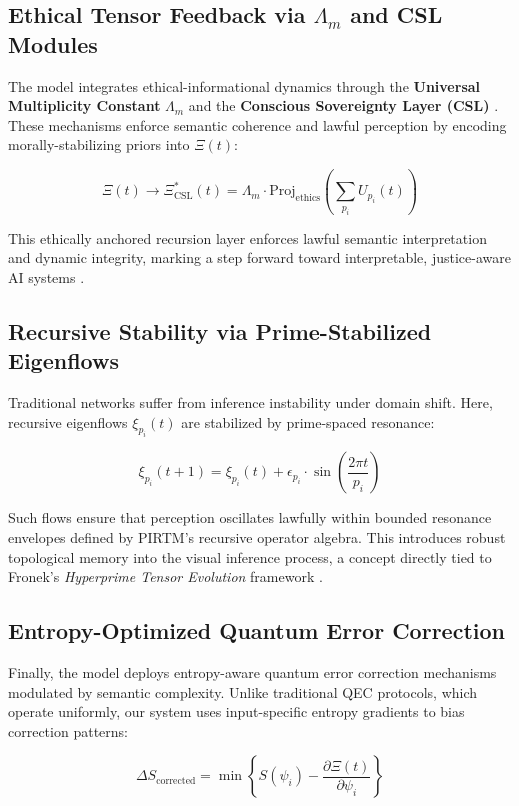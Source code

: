 \documentclass[12pt]{article}
\theoremstyle{plain}
\begin{document}
\subsection*{Ethical Tensor Feedback via $\Lambda_m$ and CSL Modules}

The model integrates ethical-informational dynamics through the \textbf{Universal Multiplicity Constant} $\Lambda_m$ and the \textbf{Conscious Sovereignty Layer (CSL)} \cite{boatwright2025}. These mechanisms enforce semantic coherence and lawful perception by encoding morally-stabilizing priors into $\Xi(t)$:

\[
\Xi(t) \rightarrow \Xi^*_{\text{CSL}}(t) = \Lambda_m \cdot \text{Proj}_{\text{ethics}} \left( \sum_{p_i} U_{p_i}(t) \right)
\]

This ethically anchored recursion layer enforces lawful semantic interpretation and dynamic integrity, marking a step forward toward interpretable, justice-aware AI systems \cite{russel2025}.

\subsection*{Recursive Stability via Prime-Stabilized Eigenflows}

Traditional networks suffer from inference instability under domain shift. Here, recursive eigenflows $\xi_{p_i}(t)$ are stabilized by prime-spaced resonance:

\[
\xi_{p_i}(t+1) = \xi_{p_i}(t) + \epsilon_{p_i} \cdot \sin\left( \frac{2\pi t}{p_i} \right)
\]

Such flows ensure that perception oscillates lawfully within bounded resonance envelopes defined by PIRTM’s recursive operator algebra. This introduces robust topological memory into the visual inference process, a concept directly tied to Fronek’s \textit{Hyperprime Tensor Evolution} framework \cite{fronek2025}.

\subsection*{Entropy-Optimized Quantum Error Correction}

Finally, the model deploys entropy-aware quantum error correction mechanisms modulated by semantic complexity. Unlike traditional QEC protocols, which operate uniformly, our system uses input-specific entropy gradients to bias correction patterns:

\[
\Delta S_{\text{corrected}} = \min \left\{ S(\psi_i) - \frac{\partial \Xi(t)}{\partial \psi_i} \right\}
\]
\end{document}
